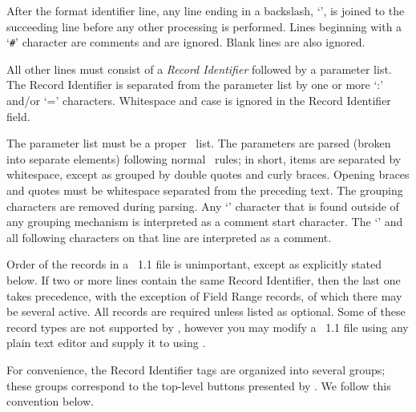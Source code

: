 After the format identifier line, any line ending in a backslash,
`\bs', is joined to the succeeding line before any other processing
is performed.  Lines beginning with a `\verb+#+' character are comments
and are ignored.  Blank lines are also ignored.

All other lines must consist of a {\em Record Identifier} followed by
a parameter list.  The Record Identifier is separated from the
parameter list by one or more `:' and/or `=' characters.  Whitespace
and case is ignored in the Record Identifier field.

The parameter list must be a proper \Tcl\ list.  The
parameters are parsed (broken into separate elements) following normal
\Tcl\ rules; in short, items are separated by whitespace, except as
grouped by double quotes and curly braces.  Opening braces and quotes
must be whitespace separated from the preceding text.  The grouping
characters are removed during parsing.  Any `\lb' character that is
found outside of any grouping mechanism is interpreted as a comment
start character.  The `\lb' and all following characters on that line
are interpreted as a comment.

Order of the records in a \MIF~1.1 file is unimportant, except as
explicitly stated below.  If two or more lines contain the same Record
Identifier, then the last one takes precedence,
with the exception of Field Range records, of which there may be several
active.  All records are required unless listed as optional.  Some of
these record types are not supported by , however you
may modify a \MIF~1.1 file using any plain text editor and supply it to
using
.

For convenience, the Record Identifier tags are organized into several
groups; these groups correspond to the top-level buttons presented by
.  We follow this convention below.

